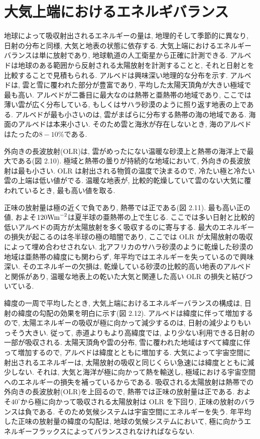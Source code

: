 \documentclass[a4j,12pt,openbib,oneside,dvipdfmx]{jbook}
\begin{document}
\newpage
{}
\section{大気上端におけるエネルギバランス}
地球によって吸収射出されるエネルギーの量は, 地理的そして季節的に異なり, 日射の分布と同様, 大気と地表の状態に依存する.
大気上端におけるエネルギーバランスは単に放射であり, 地球軌道の人工衛星から正確に計測できる.
アルベドは地球のある範囲から反射される太陽放射を計測することと, それと日射とを比較することで見積もられる.
アルベドは興味深い地理的な分布を示す. 
アルベドは, 雲と雪に覆われた部分が豊富であり, 平均した太陽天頂角が大きい極域で最も高い.
アルベドが二番目に最大なのは熱帯と亜熱帯の地域であり, ここでは薄い雲が広く分布している, もしくはサハラ砂漠のように照り返す地表の上である.
アルベドが最も小さいのは, 雲がまばらに分布する熱帯の海の地域である.
海面のアルベドは本来小さい. そのため雲と海氷が存在しないとき, 海のアルベドはたったの$8-10\%$である.
\par
外向きの長波放射(OLR)は, 雲がめったにない温暖な砂漠上と熱帯の海洋上で最大である(図 2.10).
極域と熱帯の曇りが持続的な地域において, 外向きの長波放射は最も小さい.
OLR は射出される物質の温度で決まるので, 冷たい極と冷たい雲の上端は低い値がでる.
温暖な地表が, 比較的乾燥していて雲のない大気に覆われているとき, 最も高い値を取る.
\par
正味の放射量は極の近くで負であり, 熱帯では正である(図 2.11).
最も高い正の値, およそ$120\rm{Wm}^{-2}$は夏半球の亜熱帯の上で生じる.
ここでは多い日射と比較的低いアルベドの両方が太陽放射を多く吸収するのに寄与する.
最大のエネルギーの損失が起こるのは冬半球の極の暗闇であり, ここでは OLR が太陽放射の吸収によって埋め合わせされない.
北アフリカのサハラ砂漠のように乾燥した砂漠の地域は亜熱帯の緯度にも関わらず, 年平均ではエネルギーを失っているので興味深い.
そのエネルギーの欠損は, 乾燥している砂漠の比較的高い地表のアルベドと関係があり, 温暖な地表上の乾いた大気と関連した高い OLR の損失と結びついている.
\par
緯度の一周で平均したとき, 大気上端におけるエネルギーバランスの構成は, 日射の緯度の勾配の効果を明白に示す(図 2.12).
アルベドは緯度に伴って増加するので, 太陽エネルギーの吸収が極に向かって減少するのは, 日射の減少よりもいっそう大きい.
従って, 赤道よりもより高緯度では, より少ない利用できる日射の一部が吸収される.
太陽天頂角や雲の分布, 雪に覆われた地域はすべて緯度に伴って増加するので, アルベドは緯度とともに増加する.
大気によって宇宙空間に射出されるエネルギーは, 太陽放射の吸収と同じくらい急速には緯度とともに減少しない.
それは, 大気と海洋が極に向かって熱を輸送し, 極域における宇宙空間へのエネルギーの損失を補っているからである.
吸収される太陽放射は熱帯での外向きの長波放射(OLR)を上回るので, 熱帯では正味の放射量は正である.
およそ$40^\circ$から極に向かって吸収される太陽放射は OLR を下回り, 正味の放射のバランスは負である.
そのため気候システムは宇宙空間にエネルギーを失う.
年平均した正味の放射量の緯度の勾配は, 地球の気候システムにおいて, 極に向かうエネルギーフラックスによってバランスされなければならない.
\end{document}
